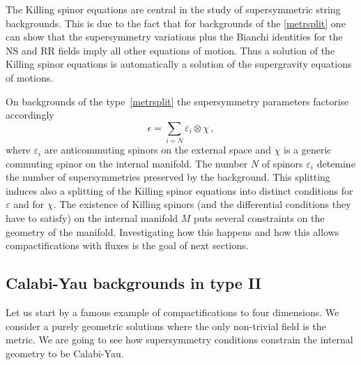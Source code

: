 \documentclass[debug]{phd}
\begin{document}
The Killing spinor equations are central in the study of supersymmetric string backgrounds. This is due to the fact that for backgrounds of the 	\eqref{metrsplit} one can show that
the supersymmetry variations plus the Bianchi identities for the NS and RR fields imply all other equations of motion. Thus a solution of the 			
Killing spinor equations is automatically a solution of the supergravity equations of motions. 				
	
	On backgrounds of the type~\eqref{metrsplit} the supersymmetry parameters factorise accordingly					%
						\begin{equation}
							\epsilon = \sum_{i=N} \varepsilon_i \otimes \chi \, ,
						\end{equation}
				where $\varepsilon_i$ are anticommuting spinors on the external space and $\chi$ is a generic commuting spinor on the internal manifold.
				The number $N$ of spinors $\varepsilon_i$ detemine the number of supersymmetries preserved by the background. 
				This splitting induces also a splitting of the Killing spinor equations into distinct conditions for $\varepsilon$ and for $\chi$.
				The existence of Killing spinors (and the differential conditions they have to satisfy) on the internal manifold $M$ puts several constraints on the geometry of the manifold. 
				Investigating how this happens and how this allows compactifications with fluxes is the goal of next sections.
						
			\subsection{Calabi-Yau backgrounds in type II}
				Let us start by a famous example of compactifications to four dimensions. We consider a purely geometric solutions where the only non-trivial field is the metric.
				We are going to see how supersymmetry conditions constrain the internal geometry to be Calabi-Yau.
				
\end{document}
